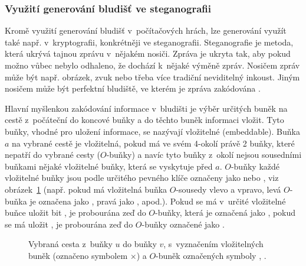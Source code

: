 \documentclass[a4paper,12pt]{article}
\begin{document}
\subsubsection*{Využití generování bludišť ve steganografii}
Kromě využití generování bludišť v~počítačových hrách, lze generování využít také např. 
v~kryptografii, konkrétněji ve steganografii. Steganografie je metoda, která ukrývá tajnou zprávu v~nějakém nosiči.
Zpráva je ukryta tak, aby pokud možno vůbec nebylo odhaleno, že dochází k~nějaké výměně zpráv. Nosičem zpráv může být např. 
obrázek, zvuk nebo třeba více tradiční neviditelný inkoust. Jiným nosičem může být perfektní bludiště, ve kterém je
zpráva zakódována \cite{Lee20102528}.

Hlavní myšlenkou zakódování informace v~bludišti je výběr určitých buněk na cestě z~počáteční do koncové
buňky a do těchto buněk informaci vložit. Tyto buňky, vhodné pro uložení informace, se nazývají vložitelné (embeddable).
Buňka $a$ na vybrané cestě je vložitelná, pokud má ve svém 4-okolí právě 2 buňky, které nepatří do vybrané cesty ($O$-buňky)
a navíc tyto buňky z~okolí nejsou sousedními buňkami nějaké vložitelné buňky, která se vyskytuje před $a$.
$O$-buňky každé vložitelné buňky jsou podle určitého pevného klíče označeny jako  nebo , viz obrázek~\ref{fig:steg} (např. pokud má 
vložitelná buňka $O$-sousedy vlevo a vpravo, levá $O$-buňka je označena jako , pravá jako , apod.). Pokud se má v~určité vložitelné buňce
uložit bit , je probourána zeď do $O$-buňky, která je označená jako , pokud se má uložit , je 
probourána zeď do $O$-buňky označené jako .

\begin{figure}[h]
  \begin{center}
 \end{center}
 \caption{Vybraná cesta z~buňky $u$ do buňky $v$, s~vyznačením vložitelných buněk (označeno symbolem $\times$) a 
  $O$-buněk označených symboly , .}
 \label{fig:steg}
\end{figure}
\end{document}
